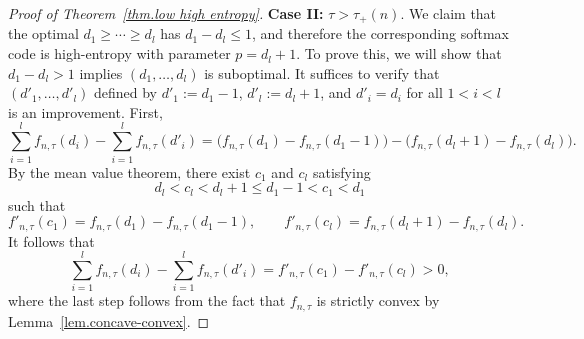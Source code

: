 \documentclass{article}
\theoremstyle{plain}
\theoremstyle{definition}
\begin{document}
\begin{proof}[Proof of Theorem~\ref{thm.low high entropy}]
\medskip
\noindent
\textbf{Case II:} $\tau>\tau_+(n)$.
We claim that the optimal $d_1\geq\cdots\geq d_l$ has $d_1-d_l\leq 1$, and therefore the corresponding softmax code is high-entropy with parameter $p=d_l+1$.
To prove this, we will show that $d_1-d_l>1$ implies $(d_1,\ldots,d_l)$ is suboptimal.
It suffices to verify that $(d'_1,\ldots,d'_l)$ defined by $d'_1:=d_1-1$, $d'_l:=d_l+1$, and $d'_i=d_i$ for all $1<i<l$ is an improvement.
First,
\[
\sum_{i=1}^l f_{n,\tau}(d_i) - \sum_{i=1}^l f_{n,\tau}(d'_i)
=\big(f_{n,\tau}(d_1)-f_{n,\tau}(d_1-1)\big)-\big(f_{n,\tau}(d_l+1)-f_{n,\tau}(d_l)\big).
\]
By the mean value theorem, there exist $c_1$ and $c_l$ satisfying
\[
d_l
<c_l
<d_l+1
\leq d_1-1
<c_1
<d_1
\]
such that
\[
f'_{n,\tau}(c_1)
=f_{n,\tau}(d_1)-f_{n,\tau}(d_1-1),
\qquad
f'_{n,\tau}(c_l)
=f_{n,\tau}(d_l+1)-f_{n,\tau}(d_l).
\]
It follows that
\[
\sum_{i=1}^l f_{n,\tau}(d_i) - \sum_{i=1}^l f_{n,\tau}(d'_i)
=f'_{n,\tau}(c_1) - f'_{n,\tau}(c_l)
>0,
\]
where the last step follows from the fact that $f_{n,\tau}$ is strictly convex by Lemma~\ref{lem.concave-convex}.
\end{proof}
\end{document}
